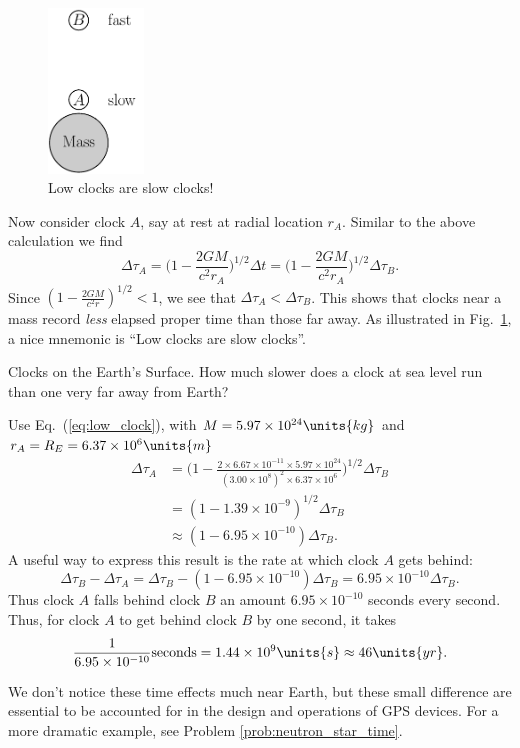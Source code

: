 \begin{figure}[tbp]
\begin{center}
\includegraphics[width=1in]{gravity_and_geometry/clocks.pdf}
\end{center}
\caption{Low clocks are slow clocks!}
\label{fig:clocks}
\end{figure}

Now consider clock $A$, say at rest at radial location $r_A$.  Similar
to the above calculation we find
\begin{equation}
 \Delta\tau_A = \biggl( 1 - \frac{2GM}{c^2 r_A}\biggr)^{1/2} \Delta t
    = \biggl( 1 - \frac{2GM}{c^2 r_A}\biggr)^{1/2} \Delta\tau_B.
\label{eq:low_clock}
\end{equation}
Since $(1-\frac{2GM}{c^2r})^{1/2} < 1$, we see that
$\Delta\tau_A<\Delta\tau_B$.
This shows that clocks near a mass record \textit{less} elapsed proper
time than those far away.  As illustrated in Fig.~\ref{fig:clocks}, a
nice mnemonic is ``Low clocks are slow clocks''.

\begin{example}{Clocks on the Earth's Surface.}
How much slower does a clock at sea level run than one very far away from
Earth?
\solution

Use Eq.~(\ref{eq:low_clock}), with $M=5.97\times 10^{24}\units{kg}$
and $r_A=R_E = 6.37\times 10^{6}\units{m}$
\begin{align}
 \Delta\tau_A &= \biggl(1-\frac{2\times 6.67\times 10^{-11}\times
   5.97\times 10^{24}}{(3.00\times 10^{8})^2 \times 6.37\times 10^{6}}
\biggr)^{1/2}\Delta\tau_B   \nonumber\\
   &= (1-1.39\times 10^{-9})^{1/2}\Delta\tau_B \nonumber\\
   &\approx (1 - 6.95\times 10^{-10}) \Delta\tau_B.
\end{align}
A useful way to express this result is the rate at which clock $A$
gets behind:
\begin{equation}
  \Delta\tau_B - \Delta\tau_A = \Delta\tau_B -
     (1 - 6.95\times 10^{-10}) \Delta\tau_B = 
6.95\times 10^{-10} \Delta\tau_B. 
\end{equation}
Thus clock $A$ falls behind clock $B$ an amount $6.95\times 10^{-10}$
seconds every second.  Thus, for clock $A$ to get behind clock $B$ by
one second, it takes 
\begin{equation}
\frac{1}{6.95\times 10^{-10}} \text{seconds} = 1.44\times
10^9\units{s}   \approx 46\units{yr}.
\end{equation}
\end{example}
We don't notice these time effects much near Earth, but these small
difference are essential to be accounted for in the design and
operations of GPS devices.  For a more dramatic example, see Problem
\ref{prob:neutron_star_time}.
 
